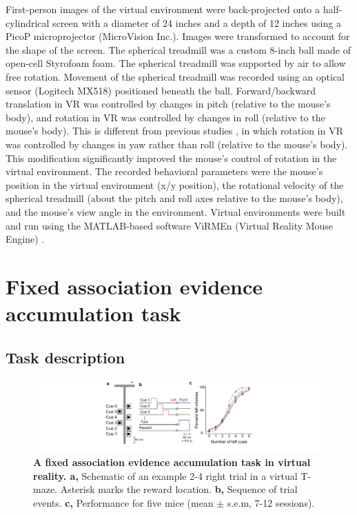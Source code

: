 First-person images of the virtual environment were back-projected onto a half-cylindrical screen with a diameter of 24 inches and a depth of 12 inches using a PicoP microprojector (MicroVision Inc.). Images were transformed to account for the shape of the screen. The spherical treadmill was a custom 8-inch ball made of open-cell Styrofoam foam. The spherical treadmill was supported by air to allow free rotation. Movement of the spherical treadmill was recorded using an optical sensor (Logitech MX518) positioned beneath the ball. Forward/backward translation in VR was controlled by changes in pitch (relative to the mouse's body), and rotation in VR was controlled by changes in roll (relative to the mouse’s body). This is different from previous studies \citep{Harvey:2012du, Harvey:2009ci, Dombeck:2010jr}, in which rotation in VR was controlled by changes in yaw rather than roll (relative to the mouse’s body). This modification significantly improved the mouse's control of rotation in the virtual environment. The recorded behavioral parameters were the mouse’s position in the virtual environment (x/y position), the rotational velocity of the spherical treadmill (about the pitch and roll axes relative to the mouse’s body), and the mouse's view angle in the environment. Virtual environments were built and run using the MATLAB-based software ViRMEn (Virtual Reality Mouse Engine) \citep{Aronov:2014hn}. 

\section{Fixed association evidence accumulation task} \label{sec:fixed_section}

\subsection{Task description} \label{sec:fixed_task}

\begin{figure}
\includegraphics[width=\textwidth]{figures/fig_2_2.pdf}
\caption[A fixed association evidence accumulation task in virtual reality.]{\textbf{A fixed association evidence accumulation task in virtual reality. a,} Schematic of an example 2-4 right trial in a virtual T-maze. Asterisk marks the reward location. \textbf{b,} Sequence of trial events. \textbf{c,} Performance for five mice (mean $\pm$ s.e.m, 7-12 sessions).
\label{fig:2_2}}
\end{figure}

